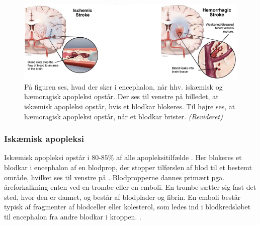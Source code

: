 \begin{figure}[H]
	\centering
	\includegraphics[scale=0.9]{figures/bProblemanalyse/haemoragisk_og_iskaemisk.png}
	\caption{På figuren ses, hvad der sker i encephalon, når hhv. iskæmisk og hæmoragisk apopleksi opstår. Der ses til venstre på billedet, at iskæmisk apopleksi opstår, hvis et blodkar blokeres. Til højre ses, at hæmoragisk apopleksi opstår, når et blodkar brister. \textit{(Revideret)} \cite{Ritter2015}}
	\label{haem-isk}
\end{figure}

\subsubsection{Iskæmisk apopleksi}\label{IskaemiskApp}
Iskæmisk apopleksi opstår i $80$-$85\%$ af alle apopleksitilfælde \cite{Sundhed.dk2014}. Her blokeres et blodkar i encephalon af en blodprop, der stopper tilførslen af blod til et bestemt område, hvilket ses til venstre på . Blodpropperne dannes primært pga. åreforkalkning enten ved en trombe eller en emboli. En trombe sætter sig fast det sted, hvor den er dannet, og består af blodplader og fibrin. \cite{Schulze2011} En emboli består typisk af fragmenter af blodceller eller kolesterol, som ledes ind i blodkredsløbet til encephalon fra andre blodkar i kroppen. \cite{Academic2015a}.%

